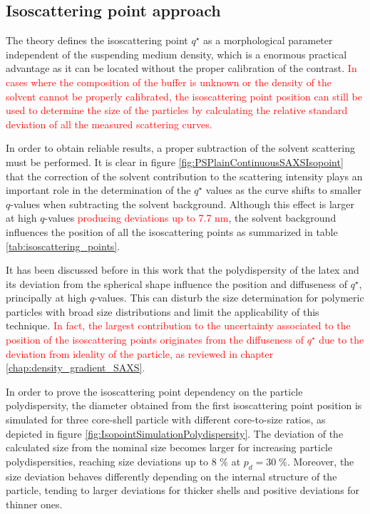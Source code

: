 \subsection{Isoscattering point approach}
\label{sec:EvaluationIsopoint}

The theory defines the isoscattering point $q^{\star}$ as a morphological parameter independent of the suspending medium density, which is a enormous practical advantage as it can be located without the proper calibration of the contrast. \textcolor{red}{In cases where the composition of the buffer is unknown or the density of the solvent cannot be properly calibrated, the isoscattering point position can still be used to determine the size of the particles by calculating the relative standard deviation of all the measured scattering curves.}

In order to obtain reliable results, a proper subtraction of the solvent scattering must be performed. It is clear in figure \ref{fig:PSPlainContinuousSAXSIsopoint} that the correction of the solvent contribution to the scattering intensity plays an important role in the determination of the $q^{\star}$ values as the curve shifts to smaller $q$-values when subtracting the solvent background. Although this effect is larger at high $q$-values \textcolor{red}{producing deviations up to 7.7 nm}, the solvent background influences the position of all the isoscattering points as summarized in table \ref{tab:isoscattering_points}.

It has been discussed before in this work that the polydispersity of the latex and its deviation from the spherical shape influence the position and diffuseness of $q^{\star}$, principally at high $q$-values. This can disturb the size determination for polymeric particles with broad size distributions and limit the applicability of this technique. \textcolor{red}{In fact, the largest contribution to the uncertainty associated to the position of the isoscattering points originates from the diffuseness of $q^{\star}$ due to the deviation from ideality of the particle, as reviewed in chapter \ref{chap:density_gradient_SAXS}.}

In order to prove the isoscattering point dependency on the particle polydispersity, the diameter obtained from the first isoscattering point position is simulated for three core-shell particle with different core-to-size ratios, as depicted in figure \ref{fig:IsopointSimulationPolydispersity}. The deviation of the calculated size from the nominal size becomes larger for increasing particle polydispersities, reaching size deviations up to 8 $\%$ at $p_d = 30\;\%$. Moreover, the size deviation behaves differently depending on the internal structure of the particle, tending to larger deviations for thicker shells and positive deviations for thinner ones.

